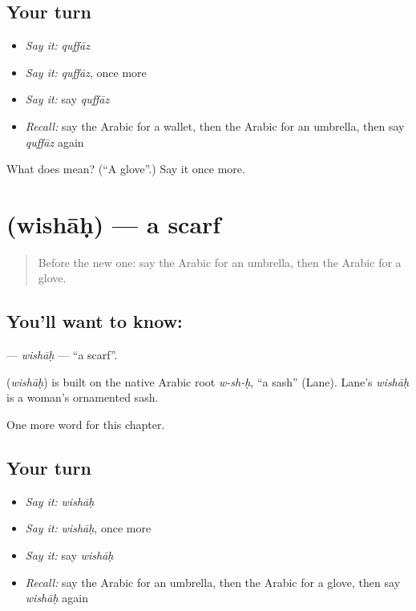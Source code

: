 \subsection*{Your turn}
\begin{itemize}
\raggedright
  \item \emph{Say it:} \emph{quffāz}
  \item \emph{Say it:} \emph{quffāz}, once more
  \item \emph{Say it:} say \emph{quffāz}
  \item \emph{Recall:} say the Arabic for a wallet, then the Arabic for an umbrella, then say \emph{quffāz} again
\end{itemize}

\begin{tcolorbox}[breakable,colback=teal!4,colframe=teal!35!black,title={Before you move on}]
What does  mean? (\textquotedblleft{}A glove\textquotedblright{}.) Say it once more.
\end{tcolorbox}
\section[\texorpdfstring{\ar{وشاح} (wishāḥ)}{وشاح (wishāḥ)}]{ (wishāḥ) — a scarf}

\label{lesson:AR-C119-wishah}



\begin{quote}
Before the new one: say the Arabic for an umbrella, then the Arabic for a glove.
\end{quote}

\subsection*{You'll want to know: }
\textbf{} — \emph{wishāḥ} — \textquotedblleft{}a scarf\textquotedblright{}.

\begin{cousinweb}
\textbf{} (\emph{wishāḥ}) is built on the native Arabic root \emph{w-sh-ḥ}, \textquotedblleft{}a sash\textquotedblright{} (Lane). Lane's \emph{wishāḥ} is a woman's ornamented sash.
\end{cousinweb}

\begin{grammarlens}[title={What you've built}]
One more word for this chapter.
\end{grammarlens}

\subsection*{Your turn}
\begin{itemize}
\raggedright
  \item \emph{Say it:} \emph{wishāḥ}
  \item \emph{Say it:} \emph{wishāḥ}, once more
  \item \emph{Say it:} say \emph{wishāḥ}
  \item \emph{Recall:} say the Arabic for an umbrella, then the Arabic for a glove, then say \emph{wishāḥ} again
\end{itemize}

